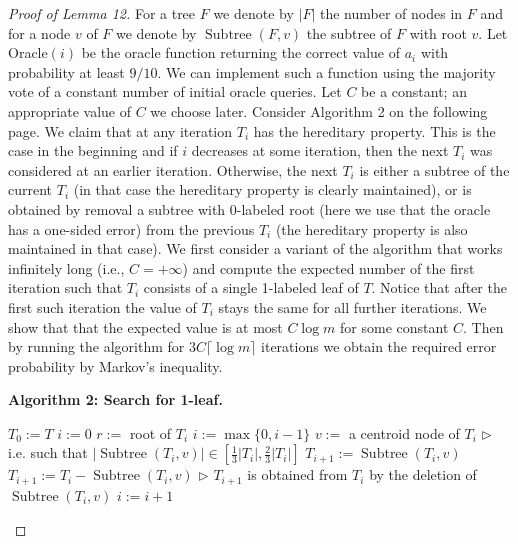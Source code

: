 \documentclass[10pt,a4paper]{article}
\newenvironment{authorclaim}[1]{\par\medskip\noindent\textbf{#1.}\ \ignorespaces}{\par\medskip}
\begin{document}
\begin{proof}[Proof of Lemma 12]
For a tree $F$ we denote by $|F|$ the number of nodes in $F$ and for a node $v$ of $F$ we denote by $\operatorname{Subtree}(F,v)$ the subtree of $F$ with root $v$. Let Oracle$(i)$ be the oracle function returning the correct value of $a_i$ with probability at least $9/10$. We can implement such a function using the majority vote of a constant number of initial oracle queries. Let $C$ be a constant; an appropriate value of $C$ we choose later. Consider Algorithm 2 on the following page.
We claim that at any iteration $T_i$ has the hereditary property. This is the case in the beginning and if $i$ decreases at some iteration, then the next $T_i$ was considered at an earlier iteration. Otherwise, the next $T_i$ is either a subtree of the current $T_i$ (in that case the hereditary property is clearly maintained), or is obtained by removal a subtree with 0-labeled root (here we use that the oracle has a one-sided error) from the previous $T_i$ (the hereditary property is also maintained in that case).
We first consider a variant of the algorithm that works infinitely long (i.e., $C=+\infty$) and compute the expected number of the first iteration such that $T_i$ consists of a single 1-labeled leaf of $T$. Notice that after the first such iteration the value of $T_i$ stays the same for all further iterations. We show that that the expected value is at most $C\log m$ for some constant $C$. Then by running the algorithm for $3C\lceil\log m\rceil$ iterations we obtain the required error probability by Markov's inequality.
\begin{authorclaim}{Algorithm 2: Search for 1-leaf}
\begin{algorithmic}
\State $T_0:=T$ 
\State $i:=0$
 \State $r:=$ root of $T_i$
  \State $i:=\max\{0,i-1\}$ 
  \State $v:=$ a centroid node of $T_i$
  \Statex \hspace{\algorithmicindent} $\triangleright$ i.e. such that $|\operatorname{Subtree}(T_i,v)|\in[\frac13|T_i|,\frac23|T_i|]$
   \State $T_{i+1}:=\operatorname{Subtree}(T_i,v)$
  \Else
   \State $T_{i+1}:=T_i-\operatorname{Subtree}(T_i,v)$
   \Statex \hspace{\algorithmicindent} $\triangleright$ $T_{i+1}$ is obtained from $T_i$ by the deletion of $\operatorname{Subtree}(T_i,v)$
  \EndIf
  \State $i:=i+1$
 \EndIf
\EndFor

\end{algorithmic}
\end{authorclaim}
\end{proof}
\end{document}
